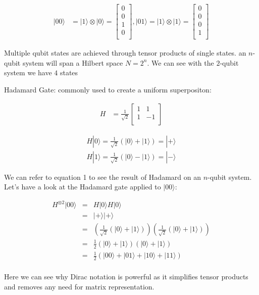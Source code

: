 \documentclass[twocolumn,showpacs,preprintnumbers,amsmath,amssymb]{revtex4}
\begin{document}
		\begin{align*}	
			|00\rangle &= |1\rangle \otimes |0\rangle = \begin{bmatrix}
				0 \\
				0 \\
				1 \\
				0 \\
			\end{bmatrix}, 
			|01\rangle = |1\rangle \otimes |1\rangle = \begin{bmatrix}
				0 \\
				0 \\
				0 \\
				1 \\
			\end{bmatrix}		
		\end{align*}
		
		
		Multiple qubit states are achieved through tensor products of single states.  an $n$-qubit system will span a Hilbert space $N = 2^n $. We can see with the $2$-qubit system we have $4$ states
		
		Hadamard Gate: commonly used to create a uniform superpositon:
		
		\begin{align*}	
			H &=\frac{1}{\sqrt{2}} \begin{bmatrix}
				1 & 1 \\
				1 &-1 \\
			\end{bmatrix}
		\end{align*}
		
		\begin{align*}	
		H|0\rangle = \frac{1}{\sqrt{2}} (|0\rangle + |1\rangle) = |+\rangle\\
		H|1\rangle = \frac{1}{\sqrt{2}} (|0\rangle - |1\rangle) = |-\rangle
		\end{align*}
			
		We can refer to equation 1 to see the result of Hadamard on an $n$-qubit system. Let's have a look at the Hadamard gate applied to $|00\rangle$:
		
		\begin{align*}	
		H^{\otimes 2}|00\rangle &=& H|0\rangle H|0\rangle\\
		&=& |+\rangle|+\rangle\\
		&=& (\frac{1}{\sqrt{2}} (|0\rangle + |1\rangle))(\frac{1}{\sqrt{2}} (|0\rangle + |1\rangle))\\
		&=& \frac{1}{2} (|0\rangle + |1\rangle)(|0\rangle + |1\rangle)\\
		&=& \frac{1}{2} (|00\rangle + |01\rangle + |10\rangle + |11\rangle)\\
		\end{align*}
		
		Here we can see why Dirac notation is powerful as it simplifies tensor products and removes any need for matrix representation.
		
			
		
			
		
		
	
\end{document}
